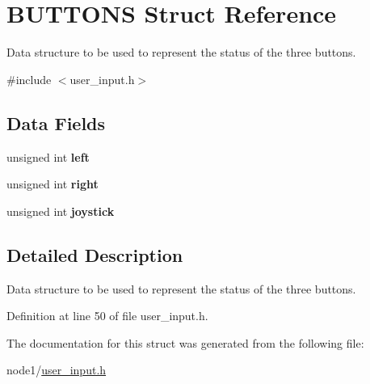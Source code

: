 \hypertarget{structBUTTONS}{}\section{B\+U\+T\+T\+O\+NS Struct Reference}
\label{structBUTTONS}


Data structure to be used to represent the status of the three buttons.  




{\ttfamily \#include $<$user\+\_\+input.\+h$>$}

\subsection*{Data Fields}
\begin{DoxyCompactItemize}
\item 
\mbox{\label{structBUTTONS_a63541eabadda76a11d803d7d231b48ff}} 
unsigned int {\bfseries left}
\item 
\mbox{\label{structBUTTONS_af09a89bfb8bb03916af79d58ef041d74}} 
unsigned int {\bfseries right}
\item 
\mbox{\label{structBUTTONS_a03a0e596156613c34a6cffae80853b6d}} 
unsigned int {\bfseries joystick}
\end{DoxyCompactItemize}


\subsection{Detailed Description}
Data structure to be used to represent the status of the three buttons. 

Definition at line 50 of file user\+\_\+input.\+h.



The documentation for this struct was generated from the following file\+:\begin{DoxyCompactItemize}
\item 
node1/\hyperlink{node1_2user__input_8h}{user\+\_\+input.\+h}\end{DoxyCompactItemize}
